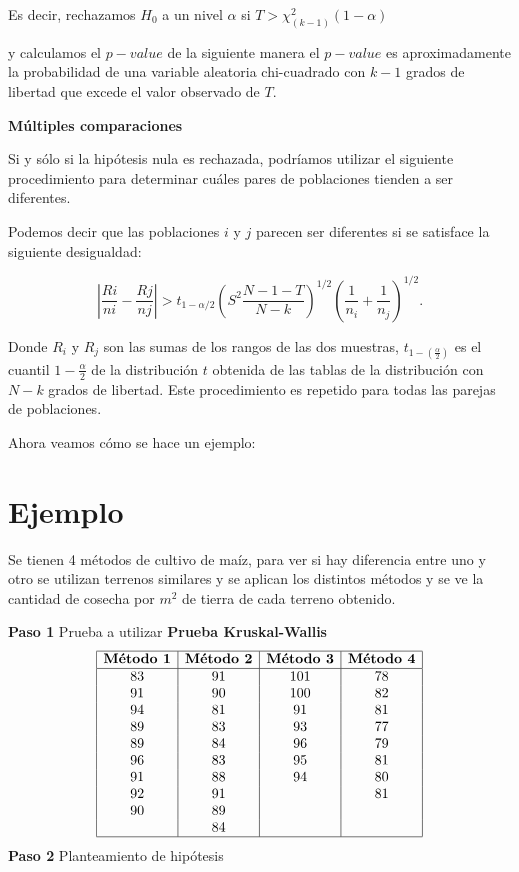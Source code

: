 \documentclass[
  a4paper,
  oneside,
  openany]{book}
\begin{document}
Es decir, rechazamos \(H_0\) a un nivel \(\alpha\) si \(T > \chi^2_{(k-1)}(1-\alpha)\)

y calculamos el \(p-value\) de la siguiente manera el \(p-value\) es aproximadamente la probabilidad de una variable aleatoria chi-cuadrado con \(k-1\) grados de libertad que excede el valor observado de \(T\).

\textbf{Múltiples comparaciones}

Si y sólo si la hipótesis nula es rechazada, podríamos utilizar el siguiente procedimiento para determinar cuáles pares de poblaciones tienden a ser diferentes.

Podemos decir que las poblaciones \(i\) y \(j\) parecen ser diferentes si se satisface la siguiente desigualdad:

\[\left|\frac{Ri}{ni}- \frac{Rj}{nj}\right|> t_{1-\alpha/2}\left(S^2\frac{N-1-T}{N-k}\right)^{1/2}\left(\frac{1}{n_i}+\frac{1}{n_j}\right)^{1/2}.\]

Donde \(R_i\) y \(R_j\) son las sumas de los rangos de las dos muestras, \(t_{1-(\frac{\alpha}{2})}\) es el cuantil \(1-\frac{\alpha}{2}\) de la distribución \(t\) obtenida de las tablas de la distribución con \(N-k\) grados de libertad. Este procedimiento es repetido para todas las parejas de poblaciones.

Ahora veamos cómo se hace un ejemplo:

\hypertarget{ejemplo-7}{%
\section{Ejemplo}\label{ejemplo-7}}

Se tienen 4 métodos de cultivo de maíz, para ver si hay diferencia entre uno y otro se utilizan terrenos similares y se aplican los distintos métodos y se ve la cantidad de cosecha por \(m^2\) de tierra de cada terreno obtenido.

\textbf{Paso 1} Prueba a utilizar \textbf{Prueba Kruskal-Wallis}
\[
\begin{array}{|c| c| c| c|} 
\hline
\textbf{Método 1} & \textbf{Método 2} & \textbf{Método 3} & \textbf{Método 4}\\
\hline
83&91&101&78\\
91&90&100&82\\
94&81&91&81\\
89&83&93&77\\
89&84&96&79\\
96&83&95&81\\
91&88&94&80\\
92&91&  &81\\
90&89&  &\\
  &84&  &\\
  \hline
\end{array}
\]
\textbf{Paso 2} Planteamiento de hipótesis
\end{document}
